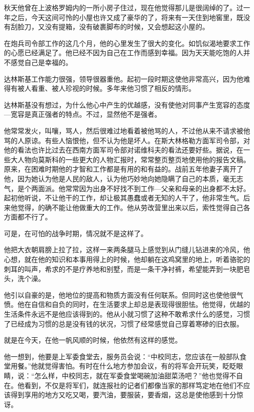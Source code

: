 秋天他曾在上波格罗姆内的一所小房子住过，现在他觉得那儿是很阔绰的了。过一年之后，今天这间可怜的小屋也许又成了豪华的了，将来有一天住到地窖里，既没有刮脸刀，又没有提箱，没有破裹脚布的时候，又会想起这小屋的。

在炮兵司令部工作的这几个月，他的心里发生了很大的变化。如饥似渴地要求工作的心愿已经满足了。他已经不因为自己在工作而感到幸福。因为天天能吃饱的人并不感觉自己是幸福的。

达林斯基工作能力很强，领导很器重他。起初一段时期这使他非常高兴，因为他难得有被人看重、被人珍视的时候。多年来他习惯了相反的情形。

达林斯基没有想过，为什么他心中产生的优越感，没有使他对同事产生宽容的态度—宽容是真正强者的特点。不过，显然他不是强者。

他常常发火，叫嚷，骂人，然后很难过地看着被他骂的人，不过他从来不请求被他骂的人原谅。有些人恼恨他，但不认为他是坏人。在斯大林格勒方面军司令部，对他的看法也许比过去在西南方面军司令部对诺维科夫的看法还要好些。据说，在一些大人物向莫斯科的一些更大的人物汇报时，常常整页整页地使用他的报告文稿。原来，在困难时期他的才智和工作都是有用的和有益的。战前五年他妻子离开了他，因为她认为他是人民的敌人，认为他巧妙地向她隐瞒了自己的本质，毫无志气，是个两面派。他常常因为出身不好找不到工作—父亲和母亲的出身都不太好。起初他听说，不让他干的工作，却让极其愚蠢或者无知的人干了，他非常生气。后来他觉得，的确不能让他做重大的工作。他从劳改营里出来以后，索性觉得自己各方面都不行了。

可是，在可怕的战争时期，情况就不是这样了。

他把大衣朝肩膀上拉了拉，这样一来两条腿马上感觉到从门缝儿钻进来的冷风，他心想，就在他的知识和本事用得上的时候，他却躺在这鸡窝里的地上，听着骆驼的刺耳的叫声，希求的不是疗养地和别墅，而是一条干净衬裤，希望能弄到一块肥皂头，洗个澡。

他引以自豪的是，他地位的提高和物质方面没有任何联系。但同时这也使他很气愤。他在自信和自负的同时，在生活要求上却总是表现得很胆怯。他觉得，优越的生活条件永远不是他应该得到的。他从小就习惯了这种不敢希求什么的感觉，习惯了已经成为习惯的总是没有钱的状况，习惯了经常感觉自己穿着寒碜的旧衣服。

就是在今天，在他一帆风顺的时候，他依然有这样的感觉。

他一想到，他要是上军委食堂去，服务员会说：“中校同志，您应该在一般部队食堂用餐。”他就觉得害怕。有时在什么地方参加会议，有的将军会开玩笑，眨眨眼睛，说：“怎么样，中校同志，就在军委食堂喝碗加油甜菜汤吧？”他也觉得不自在。他看到，不仅是将军们，就连报社的记者们都像当家的那样笃定地在他们不应该得到享用的地方又吃又喝，要汽油，要服装，要香烟，这总是使他感到十分惊讶。

